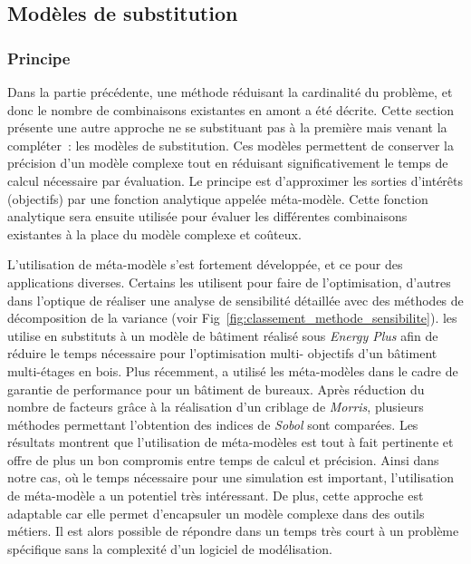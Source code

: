 \subsection{Modèles de substitution} %
\label{sub:modeles_de_substitution}
\subsubsection{Principe} %
\label{ssub:principe}
Dans la partie précédente, une méthode réduisant la cardinalité du problème, et donc le
nombre de combinaisons existantes en amont a été décrite. Cette section présente une autre
approche ne se substituant pas à la première mais venant la compléter~: les modèles de
substitution. Ces modèles permettent de conserver la précision d’un modèle complexe tout
en réduisant significativement le temps de calcul nécessaire par évaluation. Le principe
est d’approximer les sorties d’intérêts (objectifs) par une fonction analytique appelée
méta-modèle. Cette fonction analytique sera ensuite utilisée pour évaluer les différentes
combinaisons existantes à la place du modèle complexe et coûteux.

L’utilisation de méta-modèle s’est fortement développée, et ce pour des applications
diverses. Certains les utilisent pour faire de l’optimisation, d’autres dans l’optique de
réaliser une analyse de sensibilité détaillée avec des méthodes de décomposition de la
variance (voir Fig~\ref{fig:classement_methode_sensibilite}). \textcite{Armand-Decker2015}
les utilise en substituts à un modèle de bâtiment réalisé sous \textit{Energy Plus} afin
de réduire le temps nécessaire pour l’optimisation multi- objectifs d’un bâtiment multi-étages
en bois. Plus récemment, \textcite{Faggianelli201761} a utilisé les méta-modèles
dans le cadre de garantie de performance pour un bâtiment de bureaux. Après réduction du
nombre de facteurs grâce à la réalisation d’un criblage de \textit{Morris}, plusieurs
méthodes permettant l’obtention des indices de \textit{Sobol} sont comparées. Les
résultats montrent que l’utilisation de méta-modèles est tout à fait pertinente et offre
de plus un bon compromis entre temps de calcul et précision. Ainsi dans notre cas, où le
temps nécessaire pour une simulation est important, l’utilisation de méta-modèle a un
potentiel très intéressant. De plus, cette approche est adaptable car elle permet
d’encapsuler un modèle complexe dans des outils métiers. Il est alors possible de répondre
dans un temps très court à un problème spécifique sans la complexité d’un logiciel de
modélisation.

